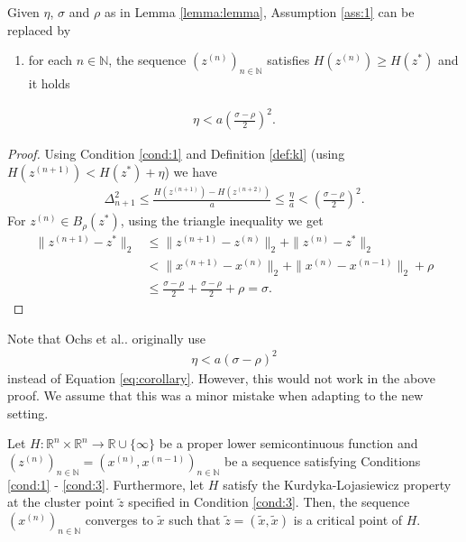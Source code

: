 \documentclass[onecolumn,final,a4paper,13pt,reqno]{siamart}
\makeatletter
\DeclareRobustCommand\onedot{\futurelet\@let@token\@onedot}
\def\@onedot{\ifx\@let@token.\else.\null\fi\xspace}
\def\etal{{et al}\onedot}
\makeatother
\begin{document}
\begin{corollarymd}
	Given $\eta$, $\sigma$ and $\rho$ as in Lemma \ref{lemma:lemma}, Assumption \ref{ass:1} can be replaced by
	\begin{enumerate}[label=(A\arabic*')]
		\item for each $n \in \mathbb{N}$, the sequence $(z^{(n)})_{n \in \mathbb{N}}$ satisfies $H(z^{(n)}) \geq H(z^\ast)$\label{ass:1p} and it holds
	\end{enumerate}
	\begin{align}
		\eta < a\left(\frac{\sigma - \rho}{2}\right)^2\label{eq:corollary}.
	\end{align}\label{corollary:corollary}
\end{corollarymd}

\begin{proof}
	Using Condition \ref{cond:1} and Definition \ref{def:kl} (using $H(z^{(n + 1)}) < H(z^\ast) + \eta$) we have
	\begin{align}
		\Delta_{n + 1}^2 \leq \frac{H(z^{(n + 1)}) - H(z^{(n + 2)})}{a} \leq \frac{\eta}{a} < \left(\frac{\sigma - \rho}{2}\right)^2.
	\end{align}
	For $z^{(n)} \in B_\rho(z^\ast)$, using the triangle inequality we get
	\begin{align}
		\|z^{(n + 1)} - z^\ast\|_2 &\leq \|z^{(n + 1)} - z^{(n)}\|_2 + \|z^{(n)} - z^\ast\|_2\\
		&< \|x^{(n + 1)} - x^{(n)}\|_2 + \|x^{(n)} - x^{(n - 1)}\|_2 + \rho\\
		&\leq \frac{\sigma - \rho}{2} + \frac{\sigma - \rho}{2} + \rho = \sigma.
	\end{align}\label{theorem:theorem}
\end{proof}

Note that Ochs \etal originally use
\begin{align}
	\eta < a(\sigma - \rho)^2
\end{align}
instead of Equation \eqref{eq:corollary}. However, this would not work in the above proof. We assume that this was a minor mistake when adapting \cite[Cor. 2.8]{AttouchBolteSvaiter:2013} to the new setting.

\begin{theoremmd}
	Let $H: \mathbb{R}^n \times \mathbb{R}^n \rightarrow \mathbb{R} \cup \{\infty\}$ be a proper lower semicontinuous function and $(z^{(n)})_{n \in \mathbb{N}} = (x^{(n)}, x^{(n - 1)})_{n \in \mathbb{N}}$ be a sequence satisfying Conditions \ref{cond:1} - \ref{cond:3}. Furthermore, let $H$ satisfy the Kurdyka-Lojasiewicz property at the cluster point $\tilde{z}$ specified in Condition \ref{cond:3}. Then, the sequence $(x^{(n)})_{n \in \mathbb{N}}$  converges to $\tilde{x}$ such that $\tilde{z} = (\tilde{x}, \tilde{x})$ is a critical point of $H$.
\end{theoremmd}
\end{document}
